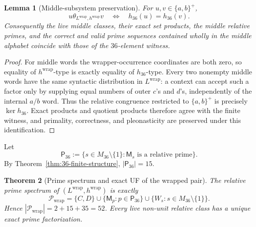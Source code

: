 \documentclass[11pt,a4paper]{article}
\newtheorem{theorem}{Theorem}[section]
\newtheorem{lemma}[theorem]{Lemma}
\newcommand{\Pcal}{\mathcal P}
\begin{document}
\begin{lemma}[Middle-subsystem preservation]
\label{lem:wrapped-middle-subsystem}
For $u,v\in\{a,b\}^+$,
\[
  u\mathrel{\theta_{L^{\mathrm{wrap}},h^{\mathrm{wrap}}}}v
  \quad\Longleftrightarrow\quad
  h_{36}(u)=h_{36}(v).
\]
Consequently the live middle classes, their exact set products, the middle relative primes, and the correct and valid prime sequences contained wholly in the middle alphabet coincide with those of the $36$-element witness.
\end{lemma}

\begin{proof}
For middle words the wrapper-occurrence coordinates are both zero, so equality of $h^{\mathrm{wrap}}$-type is exactly equality of $h_{36}$-type.  Every two nonempty middle words have the same syntactic distribution in $L^{\mathrm{wrap}}$: a context can accept such a factor only by supplying equal numbers of outer $c$'s and $d$'s, independently of the internal $a/b$ word.  Thus the relative congruence restricted to $\{a,b\}^+$ is precisely $\ker h_{36}$.  Exact products and quotient products therefore agree with the finite witness, and primality, correctness, and pleonasticity are preserved under this identification.
\end{proof}

Let
\[
  \mathsf P_{36}
  :=\{s\in M_{36}\setminus\{1\}:\mathsf M_s
      \text{ is a relative prime}\}.
\]
By Theorem~\ref{thm:36-finite-structure}, $|\mathsf P_{36}|=15$.

\begin{theorem}[Prime spectrum and exact UF of the wrapped pair]
\label{thm:wrapped-primes-uf}
The relative prime spectrum of
$(L^{\mathrm{wrap}},h^{\mathrm{wrap}})$ is exactly
\[
  \boxed{
  \Pcal_{\mathrm{wrap}}
  =\{C,D\}
   \cup\{\mathsf M_p:p\in\mathsf P_{36}\}
   \cup\{W_s:s\in M_{36}\setminus\{1\}\}.
  }
\]
Hence $|\Pcal_{\mathrm{wrap}}|=2+15+35=52$.
Every live non-unit relative class has a unique exact prime factorization.
\end{theorem}
\end{document}

